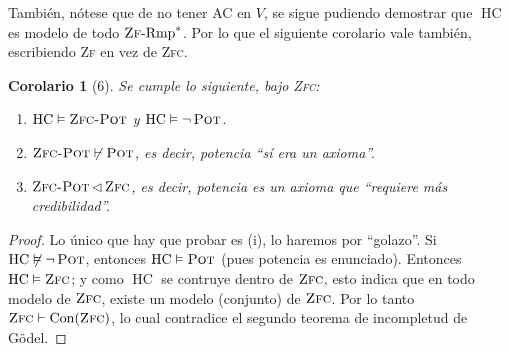 \documentclass[letterpaper,DIV=15,12pt]{scrartcl}
\theoremstyle{manual}
\newtheorem{corolario}{Corolario}
\begin{document}
    También, nótese que de no tener \textsc{AC} en $V$, se sigue pudiendo demostrar que $\operatorname*{HC}$ es modelo de todo $\operatorname*{\textsc{Zf}-Rmp}^*$. Por lo que el siguiente corolario vale también, escribiendo \textsc{Zf} en vez de \textsc{Zfc}.

    \begin{corolario}[6]
        Se cumple lo siguiente, bajo \textsc{Zfc}:
        \begin{enumerate}
            \item $\operatorname*{HC} \vDash \operatorname*{\textsc{Zfc-Pot}}$ y $\operatorname*{HC} \vDash \lnot \operatorname*{\textsc{Pot}}$.
            \item $\operatorname*{\textsc{Zfc-Pot}} \not\vdash \operatorname*{\textsc{Pot}}$, es decir, potencia ``sí era un axioma''.
            \item $\operatorname*{\textsc{Zfc-Pot}} \lhd \operatorname*{\textsc{Zfc}}$, es decir, potencia es un axioma que ``requiere más credibilidad''.
        \end{enumerate}
    \end{corolario}
    \begin{proof}
        Lo único que hay que probar es (i), lo haremos por ``golazo''. Si $\operatorname*{HC} \not\vDash \lnot \operatorname*{\textsc{Pot}}$, entonces $\operatorname*{HC} \vDash \operatorname*{\textsc{Pot}}$ (pues potencia es enunciado). Entonces $\operatorname*{HC} \vDash \operatorname*{\textsc{Zfc}}$; y como $\operatorname*{HC}$ se contruye dentro de $\operatorname*{\textsc{Zfc}}$, esto indica que en todo modelo de $\operatorname*{\textsc{Zfc}}$, existe un modelo (conjunto) de $\operatorname*{\textsc{Zfc}}$. Por lo tanto $\operatorname*{\textsc{Zfc}} \vdash \operatorname*{Con}(\operatorname*{\textsc{Zfc}})$, lo cual contradice el segundo teorema de incompletud de Gödel.
    \end{proof}
\end{document}
